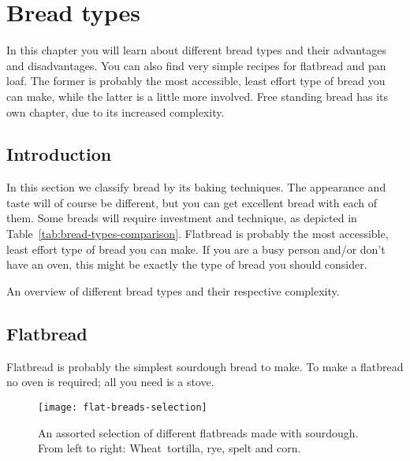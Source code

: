 \chapter{Bread types}%
\label{ch:bread-types}
\begin{quoting}
In this chapter you will learn about different bread types and their
advantages and disadvantages.  You can also find very simple recipes for
flatbread and pan loaf.  The former is probably the most accessible, least
effort type of bread you can make, while the latter is a little more involved.
Free standing bread has its own chapter, due to its increased complexity.
\end{quoting}

\section{Introduction}%
\label{sec:intro}

In this section we classify bread by its baking techniques. The appearance and
taste will of course be different, but you can get excellent bread with each
of them. Some breads will require investment and technique, as depicted in
Table~\ref{tab:bread-types-comparison}.  Flatbread is probably the most
accessible, least effort type of bread you can make. If you are a busy person
and/or don’t have an oven, this might be exactly the type of bread you should
consider. 
\begin{table}[!htb]
    \centering
        
        \caption[Different bread types]{An overview of different bread types
            and their respective complexity.}%
        \label{tab:bread-types-comparison}
\end{table}

\section{Flatbread}%
\label{sec:flatbread}

Flatbread is probably the simplest sourdough bread to make.
To make a flatbread no oven is required; all you need is a stove.

\begin{figure}[!htb]
  \texttt{[image: flat-breads-selection]}
  \caption[Flatbread selection with different flours]{An assorted selection of
      different flatbreads made with sourdough. From left to right:
      Wheat~tortilla, rye, spelt and corn.}%
\end{figure}


